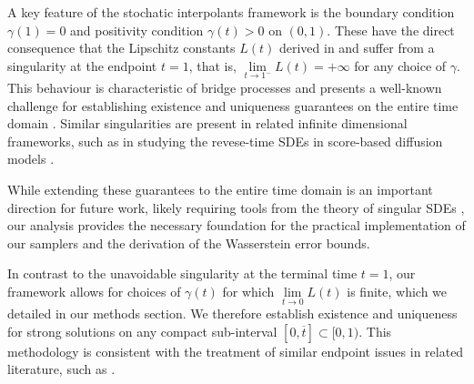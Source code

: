 \begin{remarkbox}
  \begin{remark}
    A key feature of the stochatic interpolants framework is the boundary condition \(\gamma(1) = 0\) and positivity condition \(\gamma(t) > 0\) on \((0, 1)\). These have the direct consequence that the Lipschitz constants \(L(t)\) derived in  and  suffer from a singularity at the endpoint \(t =1\), that is, \(\lim\limits_{t \to 1^{-}} L(t) = +\infty\) for any choice of \(\gamma\). This behaviour is characteristic of bridge processes and presents a well-known challenge for establishing existence and uniqueness guarantees on the entire time domain \citep[see, e.g.,][]{li2016generalised}. Similar singularities are present in related infinite dimensional frameworks, such as in studying the revese-time SDEs in score-based diffusion models \citep[Theorem 12]{pidstrigach2023infinite}.

    While extending these guarantees to the entire time domain is an important direction for future work, likely requiring tools from the theory of singular SDEs \citep[see, e.g.,][]{cherny2005singular,flandoli2010well,hairer2014theory}, our analysis provides the necessary foundation for the practical implementation of our samplers and the derivation of the Wasserstein error bounds.

    In contrast to the unavoidable singularity at the terminal time \(t=1\), our framework allows for choices of \(\gamma(t)\) for which \(\lim\limits_{t \to 0} L(t)\) is finite, which we detailed in our methods section. We therefore establish existence and uniqueness for strong solutions on any compact sub-interval \([0, \overline{t}] \subset [0, 1)\). This methodology is consistent with the treatment of similar endpoint issues in related literature, such as \citet{pidstrigach2023infinite}.
  \end{remark}
\end{remarkbox}

